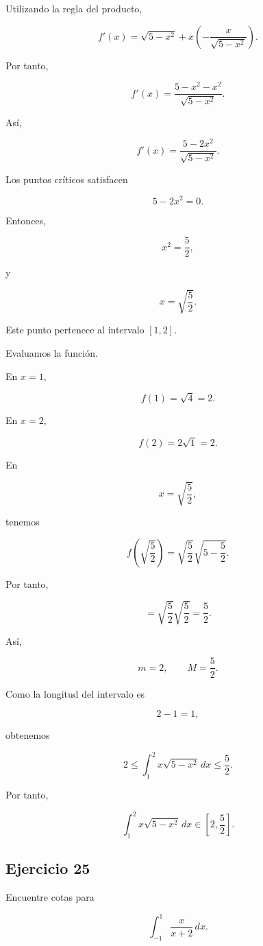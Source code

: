 \documentclass[12pt]{article}
\begin{document}
Utilizando la regla del producto,

\[
f'(x)
=
\sqrt{5-x^2}
+
x\left(
-\frac{x}{\sqrt{5-x^2}}
\right).
\]

Por tanto,

\[
f'(x)
=
\frac{5-x^2-x^2}{\sqrt{5-x^2}}.
\]

Así,

\[
f'(x)
=
\frac{5-2x^2}{\sqrt{5-x^2}}.
\]

Los puntos críticos satisfacen

\[
5-2x^2=0.
\]

Entonces,

\[
x^2=\frac52,
\]

y

\[
x=\sqrt{\frac52}.
\]

Este punto pertenece al intervalo \([1,2]\).

Evaluamos la función.

En \(x=1\),

\[
f(1)
=
\sqrt4
=
2.
\]

En \(x=2\),

\[
f(2)
=
2\sqrt1
=
2.
\]

En

\[
x=\sqrt{\frac52},
\]

tenemos

\[
f\left(\sqrt{\frac52}\right)
=
\sqrt{\frac52}
\sqrt{5-\frac52}.
\]

Por tanto,

\[
=
\sqrt{\frac52}
\sqrt{\frac52}
=
\frac52.
\]

Así,

\[
m=2,
\qquad
M=\frac52.
\]

Como la longitud del intervalo es

\[
2-1=1,
\]

obtenemos

\[
2
\leq
\int_1^2x\sqrt{5-x^2}\,dx
\leq
\frac52.
\]

Por tanto,

\[
\boxed{
\int_1^2x\sqrt{5-x^2}\,dx
\in
\left[2,\frac52\right]
}.
\]

\subsection*{Ejercicio 25}

Encuentre cotas para

\[
\int_{-1}^{1}\frac{x}{x+2}\,dx.
\]
\end{document}
